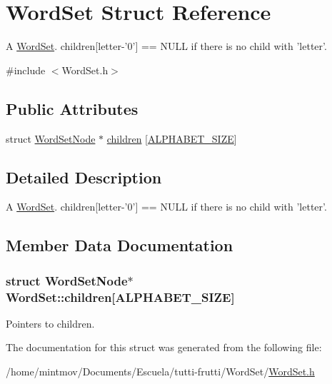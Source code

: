 \hypertarget{structWordSet}{\section{Word\-Set Struct Reference}
\label{structWordSet}
}


A \hyperlink{structWordSet}{Word\-Set}. children\mbox{[}letter-\/'0'\mbox{]} == N\-U\-L\-L if there is no child with 'letter'.  




{\ttfamily \#include $<$Word\-Set.\-h$>$}

\subsection*{Public Attributes}
\begin{DoxyCompactItemize}
\item 
struct \hyperlink{structWordSetNode}{Word\-Set\-Node} $\ast$ \hyperlink{structWordSet_a4f3fcba9e4c2333b1ef8e1756305efc3}{children} \mbox{[}\hyperlink{WordSet_8h_a6572f1706059832f94025fa12c6c45ed}{A\-L\-P\-H\-A\-B\-E\-T\-\_\-\-S\-I\-Z\-E}\mbox{]}
\end{DoxyCompactItemize}


\subsection{Detailed Description}
A \hyperlink{structWordSet}{Word\-Set}. children\mbox{[}letter-\/'0'\mbox{]} == N\-U\-L\-L if there is no child with 'letter'. 

\subsection{Member Data Documentation}
\hypertarget{structWordSet_a4f3fcba9e4c2333b1ef8e1756305efc3}{
\subsubsection[{children}]{\setlength{\rightskip}{0pt plus 5cm}struct {\bf Word\-Set\-Node}$\ast$ Word\-Set\-::children\mbox{[}{\bf A\-L\-P\-H\-A\-B\-E\-T\-\_\-\-S\-I\-Z\-E}\mbox{]}}}\label{structWordSet_a4f3fcba9e4c2333b1ef8e1756305efc3}
Pointers to children. 

The documentation for this struct was generated from the following file\-:\begin{DoxyCompactItemize}
\item 
/home/mintmov/\-Documents/\-Escuela/tutti-\/frutti/\-Word\-Set/\hyperlink{WordSet_8h}{Word\-Set.\-h}\end{DoxyCompactItemize}
